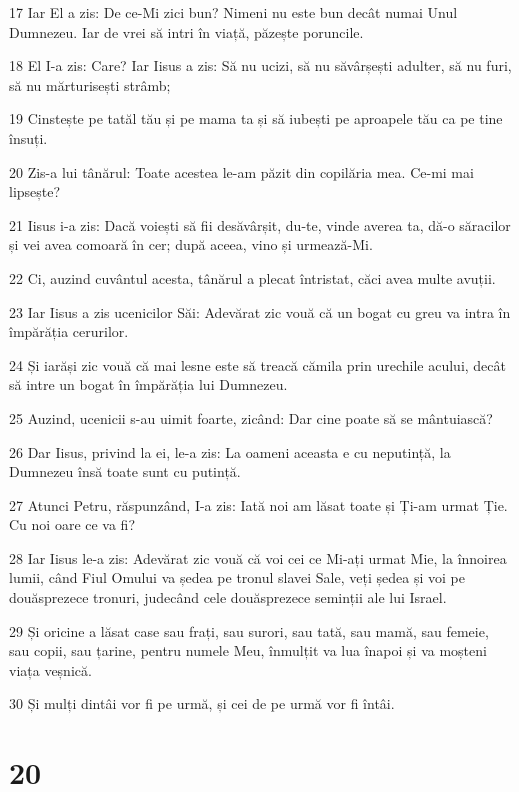 \par 17 Iar El a zis: De ce-Mi zici bun? Nimeni nu este bun decât numai Unul Dumnezeu. Iar de vrei să intri în viață, păzește poruncile.
\par 18 El I-a zis: Care? Iar Iisus a zis: Să nu ucizi, să nu săvârșești adulter, să nu furi, să nu mărturisești strâmb;
\par 19 Cinstește pe tatăl tău și pe mama ta și să iubești pe aproapele tău ca pe tine însuți.
\par 20 Zis-a lui tânărul: Toate acestea le-am păzit din copilăria mea. Ce-mi mai lipsește?
\par 21 Iisus i-a zis: Dacă voiești să fii desăvârșit, du-te, vinde averea ta, dă-o săracilor și vei avea comoară în cer; după aceea, vino și urmează-Mi.
\par 22 Ci, auzind cuvântul acesta, tânărul a plecat întristat, căci avea multe avuții.
\par 23 Iar Iisus a zis ucenicilor Săi: Adevărat zic vouă că un bogat cu greu va intra în împărăția cerurilor.
\par 24 Și iarăși zic vouă că mai lesne este să treacă cămila prin urechile acului, decât să intre un bogat în împărăția lui Dumnezeu.
\par 25 Auzind, ucenicii s-au uimit foarte, zicând: Dar cine poate să se mântuiască?
\par 26 Dar Iisus, privind la ei, le-a zis: La oameni aceasta e cu neputință, la Dumnezeu însă toate sunt cu putință.
\par 27 Atunci Petru, răspunzând, I-a zis: Iată noi am lăsat toate și Ți-am urmat Ție. Cu noi oare ce va fi?
\par 28 Iar Iisus le-a zis: Adevărat zic vouă că voi cei ce Mi-ați urmat Mie, la înnoirea lumii, când Fiul Omului va ședea pe tronul slavei Sale, veți ședea și voi pe douăsprezece tronuri, judecând cele douăsprezece seminții ale lui Israel.
\par 29 Și oricine a lăsat case sau frați, sau surori, sau tată, sau mamă, sau femeie, sau copii, sau țarine, pentru numele Meu, înmulțit va lua înapoi și va moșteni viața veșnică.
\par 30 Și mulți dintâi vor fi pe urmă, și cei de pe urmă vor fi întâi.

\chapter{20}

